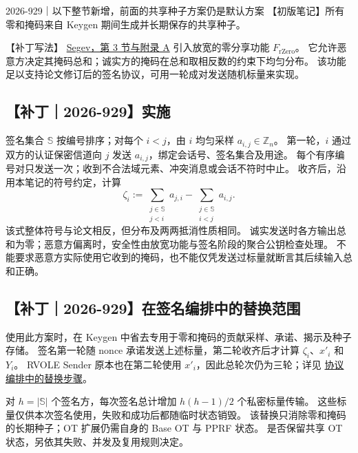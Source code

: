 \begin{patchnote}{2026-929｜以下整节新增，前面的共享种子方案仍是默认方案}
【初版笔记】所有零和掩码来自 Keygen 期间生成并长期保存的共享种子。

【补丁写法】
\href{https://eprint.iacr.org/2026/929.pdf}{Segev，第 3 节与附录 A}
引入放宽的零分享功能 $F_{\mathrm{rZero}}$。
它允许恶意方决定其掩码总和；诚实方的掩码在总和取相反数的约束下均匀分布。
该功能足以支持论文修订后的签名协议，可用一轮成对发送随机标量来实现。

\subsection{【补丁｜2026-929】实施}

签名集合 $\mathbb S$ 按编号排序；对每个 $i<j$，由 $i$ 均匀采样 $a_{i,j}\in\mathbb Z_n$。
第一轮，$i$ 通过双方的认证保密信道向 $j$ 发送 $a_{i,j}$，绑定会话号、签名集合及用途。
每个有序编号对只发送一次；收到不合法域元素、冲突消息或会话不符时中止。
收齐后，沿用本笔记的符号约定，计算
\begin{equation}\label{eq:rerand:fresh-zero}
\zeta_i:=\sum_{\substack{j\in\mathbb S\\j<i}}a_{j,i}
       -\sum_{\substack{j\in\mathbb S\\i<j}}a_{i,j}.
\end{equation}
该式整体符号与论文相反，但分布及两两抵消性质相同。
诚实发送时各方输出总和为零；恶意方偏离时，安全性由放宽功能与签名阶段的聚合公钥检查处理。
不能要求恶意方实际使用它收到的掩码，也不能仅凭发送过标量就断言其后续输入总和正确。

\subsection{【补丁｜2026-929】在签名编排中的替换范围}

使用此方案时，在 Keygen 中省去专用于零和掩码的贡献采样、承诺、揭示及种子存储。
签名第一轮随 nonce 承诺发送上述标量，第二轮收齐后才计算 $\zeta_i$、$x'_i$ 和 $Y_i$。
RVOLE Sender 原本也在第二轮使用 $x'_i$，因此总轮次仍为三轮；详见
\hyperref[sec:orch:fresh-zero]{协议编排中的替换步骤}。

对 $h=|\mathbb S|$ 个签名方，每次签名总计增加 $h(h-1)/2$ 个私密标量传输。
这些标量仅供本次签名使用，失败和成功后都随临时状态销毁。
该替换只消除零和掩码的长期种子；OT 扩展仍需自身的 Base OT 与 PPRF 状态。
是否保留共享 OT 状态，另依其失败、并发及复用规则决定。
\end{patchnote}
